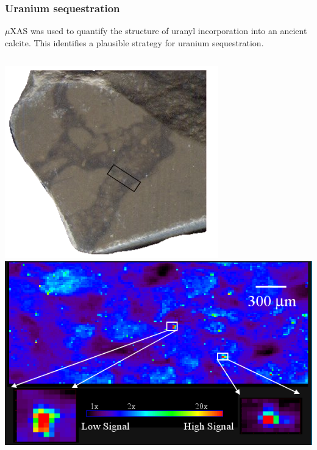 \documentclass[10pt, xcolor=x11names, compress]{beamer}
\begin{document}
\begin{frame}
  \frametitle{Uranium sequestration}

  \small
  \begin{exampleblock}{}
    $\mu$XAS was used to quantify the structure of uranyl
    incorporation into an ancient calcite.  This identifies a
    plausible strategy for uranium sequestration.
  \end{exampleblock}
  \begin{columns}
    \begin{column}{0.6\linewidth}
      \includegraphics[width=0.4\linewidth]{pses/rock.png}
      \includegraphics[width=0.6\linewidth]{pses/Umap.png}


\end{column}
\end{columns}
\end{frame}
\end{document}
